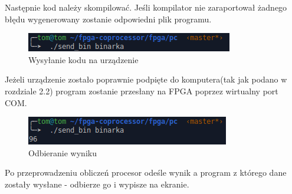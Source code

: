 Następnie kod należy skompilować. Jeśli kompilator nie zaraportował żadnego błędu wygenerowany zostanie odpowiedni plik programu.
\begin{figure}[H]
\centering
\includegraphics[scale=0.75]{images/exec3}
\caption{Wysyłanie kodu na urządzenie}
\end{figure}
Jeżeli urządzenie zostało poprawnie podpięte do komputera(tak jak podano w rozdziale 2.2) program zostanie przesłany na FPGA poprzez wirtualny port COM.
\begin{figure}[H]
\centering
\includegraphics[scale=0.75]{images/exec4}
\caption{Odbieranie wyniku}
\end{figure}
Po przeprowadzeniu obliczeń procesor odeśle wynik a program z którego dane zostały wysłane - odbierze go i wypisze na ekranie.